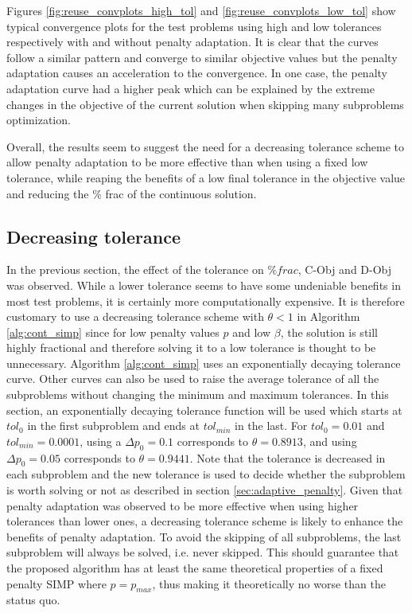   Figures \ref{fig:reuse_convplots_high_tol} and \ref{fig:reuse_convplots_low_tol} show typical convergence plots for the test problems using high and low tolerances respectively with and without penalty adaptation. It is clear that the curves follow a similar pattern and converge to similar objective values but the penalty adaptation causes an acceleration to the convergence. In one case, the penalty adaptation curve had a higher peak which can be explained by the extreme changes in the objective of the current solution when skipping many subproblems optimization. 

  Overall, the results seem to suggest the need for a decreasing tolerance scheme to allow penalty adaptation to be more effective than when using a fixed low tolerance, while reaping the benefits of a low final tolerance in the objective value and reducing the \% frac of the continuous solution.

  \subsection{Decreasing tolerance}

  In the previous section, the effect of the tolerance on $\% frac$, C-Obj and D-Obj was observed. While a lower tolerance seems to have some undeniable benefits in most test problems, it is certainly more computationally expensive. It is therefore customary to use a decreasing tolerance scheme with $\theta < 1$ in Algorithm \ref{alg:cont_simp} since for low penalty values $p$ and low $\beta$, the solution is still highly fractional and therefore solving it to a low tolerance is thought to be unnecessary. Algorithm \ref{alg:cont_simp} uses an exponentially decaying tolerance curve. Other curves can also be used to raise the average tolerance of all the subproblems without changing the minimum and maximum tolerances. In this section, an exponentially decaying tolerance function will be used which starts at $tol_0$ in the first subproblem and ends at $tol_{min}$ in the last. For $tol_0 = 0.01$ and $tol_{min} = 0.0001$, using a $\Delta p_0 = 0.1$ corresponds to $\theta = 0.8913$, and using $\Delta p_0 = 0.05$ corresponds to $\theta = 0.9441$. Note that the tolerance is decreased in each subproblem and the new tolerance is used to decide whether the subproblem is worth solving or not as described in section \ref{sec:adaptive_penalty}. Given that penalty adaptation was observed to be more effective when using higher tolerances than lower ones, a decreasing tolerance scheme is likely to enhance the benefits of penalty adaptation. To avoid the skipping of all subproblems, the last subproblem will always be solved, i.e. never skipped. This should guarantee that the proposed algorithm has at least the same theoretical properties of a fixed penalty SIMP where $p = p_{max}$, thus making it theoretically no worse than the status quo. 

